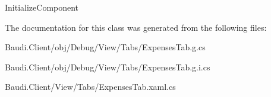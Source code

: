 Initialize\+Component 



The documentation for this class was generated from the following files\+:\begin{DoxyCompactItemize}
\item 
Baudi.\+Client/obj/\+Debug/\+View/\+Tabs/Expenses\+Tab.\+g.\+cs\item 
Baudi.\+Client/obj/\+Debug/\+View/\+Tabs/Expenses\+Tab.\+g.\+i.\+cs\item 
Baudi.\+Client/\+View/\+Tabs/Expenses\+Tab.\+xaml.\+cs\end{DoxyCompactItemize}
